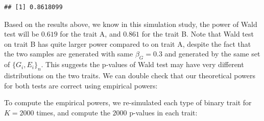 \documentclass[
]{article}
\newenvironment{Shaded}{\begin{snugshade}}{\end{snugshade}}
\newcommand{\CommentTok}[1]{\textcolor[rgb]{0.56,0.35,0.01}{\textit{#1}}}
\newcommand{\ControlFlowTok}[1]{\textcolor[rgb]{0.13,0.29,0.53}{\textbf{#1}}}
\newcommand{\DataTypeTok}[1]{\textcolor[rgb]{0.13,0.29,0.53}{#1}}
\newcommand{\DecValTok}[1]{\textcolor[rgb]{0.00,0.00,0.81}{#1}}
\newcommand{\FloatTok}[1]{\textcolor[rgb]{0.00,0.00,0.81}{#1}}
\newcommand{\KeywordTok}[1]{\textcolor[rgb]{0.13,0.29,0.53}{\textbf{#1}}}
\newcommand{\NormalTok}[1]{#1}
\newcommand{\OperatorTok}[1]{\textcolor[rgb]{0.81,0.36,0.00}{\textbf{#1}}}
\newcommand{\StringTok}[1]{\textcolor[rgb]{0.31,0.60,0.02}{#1}}
\begin{document}
\begin{verbatim}
## [1] 0.8618099
\end{verbatim}

Based on the results above, we know in this simulation study, the power
of Wald test will be \(0.619\) for the trait A, and \(0.861\) for the
trait B. Note that Wald test on trait B has quite larger power compared
to on trait A, despite the fact that the two samples are generated with
same \(\beta_G = 0.3\) and generated by the same set of
\(\{G_i,E_i\}_n\). This suggests the p-values of Wald test may have very
different distributions on the two traits. We can double check that our
theoretical powers for both tests are correct using empirical powers:

To compute the empirical powers, we re-simulated each type of binary
trait for \(K = 2000\) times, and compute the \(2000\) p-values in each
trait:

\begin{Shaded}
\end{Shaded}
\end{document}
